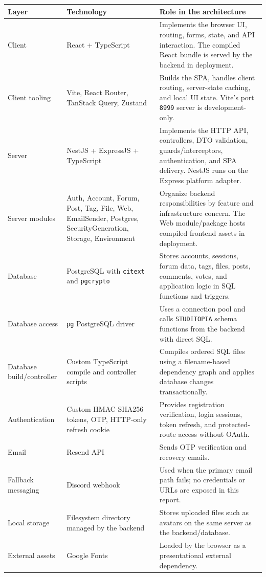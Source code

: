\documentclass[12pt]{article}
\renewcommand{\baselinestretch}{1.5}
\begin{document}
\begingroup
\small
\renewcommand{\baselinestretch}{1.0}\selectfont
\renewcommand{\arraystretch}{1.15}
\setlength{\tabcolsep}{6pt}
\begin{longtable}{|>{\raggedright\arraybackslash}p{}|>{\raggedright\arraybackslash}p{}|>{\raggedright\arraybackslash}p{}|}
\hline
\textbf{Layer} & \textbf{Technology} & \textbf{Role in the architecture} \\ \hline
\endhead
Client & React + TypeScript & Implements the browser UI, routing, forms, state, and API interaction. The compiled React bundle is served by the backend in deployment. \\ \hline
Client tooling & Vite, React Router, TanStack Query, Zustand & Builds the SPA, handles client routing, server-state caching, and local UI state. Vite's port \texttt{8999} server is development-only. \\ \hline
Server & NestJS + ExpressJS + TypeScript & Implements the HTTP API, controllers, DTO validation, guards/interceptors, authentication, and SPA delivery. NestJS runs on the Express platform adapter. \\ \hline
Server modules & Auth, Account, Forum, Post, Tag, File, Web, EmailSender, Postgres, SecurityGeneration, Storage, Environment & Organize backend responsibilities by feature and infrastructure concern. The Web module/package hosts compiled frontend assets in deployment. \\ \hline
Database & PostgreSQL with \texttt{citext} and \texttt{pgcrypto} & Stores accounts, sessions, forum data, tags, files, posts, comments, votes, and application logic in SQL functions and triggers. \\ \hline
Database access & \texttt{pg} PostgreSQL driver & Uses a connection pool and calls \texttt{STUDITOPIA} schema functions from the backend with direct SQL. \\ \hline
Database build/controller & Custom TypeScript compile and controller scripts & Compiles ordered SQL files using a filename-based dependency graph and applies database changes transactionally. \\ \hline
Authentication & Custom HMAC-SHA256 tokens, OTP, HTTP-only refresh cookie & Provides registration verification, login sessions, token refresh, and protected-route access without OAuth. \\ \hline
Email & Resend API & Sends OTP verification and recovery emails. \\ \hline
Fallback messaging & Discord webhook & Used when the primary email path fails; no credentials or URLs are exposed in this report. \\ \hline
Local storage & Filesystem directory managed by the backend & Stores uploaded files such as avatars on the same server as the backend/database. \\ \hline
External assets & Google Fonts & Loaded by the browser as a presentational external dependency. \\ \hline
\end{longtable}
\endgroup
\par\medskip
\end{document}
